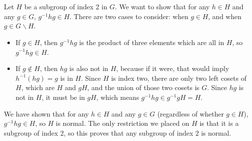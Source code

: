 \documentclass[12pt]{article}
\begin{document}
\section{}
\noindent{}\bigskip

\section{}
\noindent{}\bigskip

Let $H$ be a subgroup of index 2 in $G$. We want to show that for any $h \in H$ and any $g \in G$, $g^{-1}hg \in H$. There are two cases to consider: when $g \in H$, and when $g \in G \backslash H$.

\begin{itemize}
    \item If $g \in H$, then $g^{-1}hg$ is the product of three elements which are all in $H$, so $g^{-1}hg \in H$.
    \item If $g \not\in H$, then $hg$ is also not in $H$, because if it were, that would imply $h^{-1}(hg) = g$ is in $H$. Since $H$ is index two, there are only two left cosets of $H$, which are $H$ and $gH$, and the union of those two cosets is $G$. Since $hg$ is not in $H$, it must be in $gH$, which means $g^{-1}hg \in g^{-1}gH = H$.
\end{itemize}

We have shown that for any $h \in H$ and any $g \in G$ (regardless of whether $g \in H$), $g^{-1}hg \in H$, so $H$ is normal. The only restriction we placed on $H$ is that it is a subgroup of index 2, so this proves that any subgroup of index 2 is normal.
\end{document}
